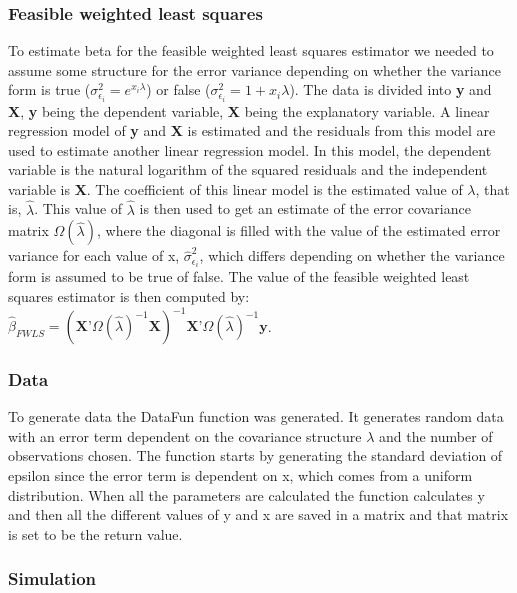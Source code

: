 \documentclass{article}\usepackage[]{graphicx}\usepackage[]{color}
\begin{document}
\subsubsection*{Feasible weighted least squares}

To estimate beta for the feasible weighted least squares estimator we needed to assume some structure for the error variance depending on whether the variance form is true ($\sigma^2_{\epsilon_i} = e^{x_i\lambda}$) or false ($\sigma^2_{\epsilon_i} = 1 + x_i\lambda$). The data is divided into \textbf{y} and \textbf{X}, \textbf{y} being the dependent variable, \textbf{X} being the explanatory variable. A linear regression model of \textbf{y} and \textbf{X} is estimated and the residuals from this model are used to estimate another linear regression model. In this model, the dependent variable is the natural logarithm of the squared residuals and the independent variable is \textbf{X}. The coefficient of this linear model is the estimated value of $\lambda$, that is, $\hat{\lambda}$. This value of $\hat{\lambda}$ is then used to get an estimate of the error covariance matrix $\Omega(\hat{\lambda})$, where the diagonal is filled with the value of the estimated error variance for each value of x, $\hat{\sigma}^2_{\epsilon_i}$, which differs depending on whether the variance form is assumed to be true of false. 
The value of the feasible weighted least squares estimator is then computed by: $\hat{\beta}_{FWLS}=(\textbf{X}’\Omega(\hat{\lambda})^{-1}\textbf{X})^{-1}\textbf{X}’\Omega(\hat{\lambda})^{-1}\textbf{y}$.




\subsubsection*{Data}

To generate data the DataFun function was generated. It generates random data with an error term dependent on the covariance structure $   \lambda $ and the number of observations chosen. The function starts by generating the standard deviation of epsilon since the error term is dependent on x, which comes from a uniform distribution. When all the parameters are calculated the function calculates y and then all the different values of y and x are saved in a matrix and that matrix is set to be the return value.



\subsubsection*{Simulation}
\end{document}
